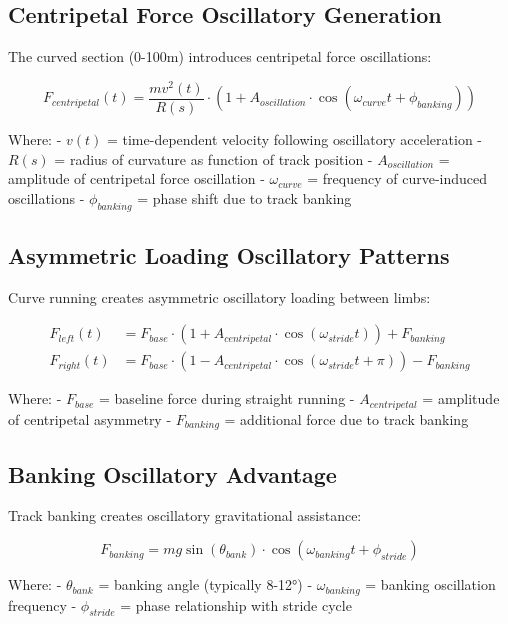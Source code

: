 \documentclass[12pt]{article}
\begin{document}
\subsection{Centripetal Force Oscillatory Generation}

The curved section (0-100m) introduces centripetal force oscillations:

\begin{equation}
F_{centripetal}(t) = \frac{mv^2(t)}{R(s)} \cdot \left(1 + A_{oscillation} \cdot \cos(\omega_{curve}t + \phi_{banking})\right)
\end{equation}

Where:
- $v(t)$ = time-dependent velocity following oscillatory acceleration
- $R(s)$ = radius of curvature as function of track position
- $A_{oscillation}$ = amplitude of centripetal force oscillation
- $\omega_{curve}$ = frequency of curve-induced oscillations
- $\phi_{banking}$ = phase shift due to track banking

\subsection{Asymmetric Loading Oscillatory Patterns}

Curve running creates asymmetric oscillatory loading between limbs:

\begin{align}
F_{left}(t) &= F_{base} \cdot \left(1 + A_{centripetal} \cdot \cos(\omega_{stride}t)\right) + F_{banking} \\
F_{right}(t) &= F_{base} \cdot \left(1 - A_{centripetal} \cdot \cos(\omega_{stride}t + \pi)\right) - F_{banking}
\end{align}

Where:
- $F_{base}$ = baseline force during straight running
- $A_{centripetal}$ = amplitude of centripetal asymmetry
- $F_{banking}$ = additional force due to track banking

\subsection{Banking Oscillatory Advantage}

Track banking creates oscillatory gravitational assistance:

\begin{equation}
F_{banking} = mg \sin(\theta_{bank}) \cdot \cos(\omega_{banking}t + \phi_{stride})
\end{equation}

Where:
- $\theta_{bank}$ = banking angle (typically 8-12°)
- $\omega_{banking}$ = banking oscillation frequency
- $\phi_{stride}$ = phase relationship with stride cycle
\end{document}
